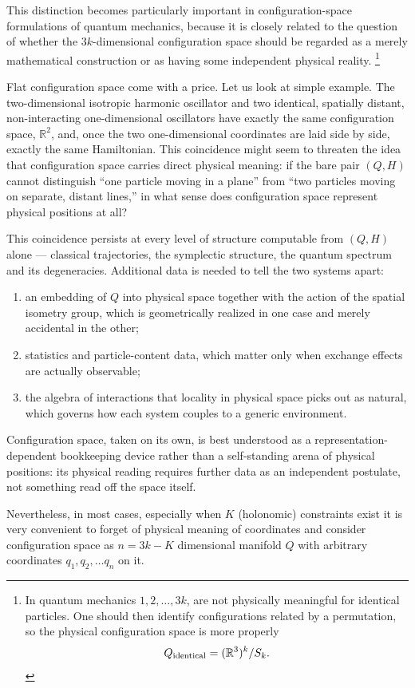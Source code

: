 This distinction becomes particularly important in configuration-space
formulations of  quantum mechanics, because it is closely related
to the question of whether the \(3k\)-dimensional configuration space should be
regarded as a merely mathematical construction or as having some independent
physical reality.
\footnote{In quantum mechanics  $ 1,2,\ldots,3k $,
are not physically meaningful for identical particles. One should then identify
configurations related by a permutation,
so the physical configuration space is more properly
\[ Q_{\rm identical} = (\mathbb R^3)^k/S_k. \]}

Flat configuration space  come with a price. Let us look at simple example.
The two-dimensional isotropic harmonic oscillator and two identical, spatially
distant, non-interacting one-dimensional oscillators have exactly the same
configuration space, $\mathbb{R}^2$, and, once the two one-dimensional
coordinates are laid side by side, exactly the same Hamiltonian. This
coincidence might seem to threaten the idea that configuration space carries
direct physical meaning: if the bare pair $(Q,H)$ cannot distinguish ``one
particle moving in a plane'' from ``two particles moving on separate, distant
lines,'' in what sense does configuration space represent physical positions at
all? 

This coincidence  persists at every
level of structure computable from $(Q,H)$ alone --- classical trajectories,
the symplectic structure, the quantum spectrum and its degeneracies.
Additional data is needed to tell the two systems
apart: 
\begin{enumerate}
   \item an embedding of $Q$ into physical space together with the action of
the spatial isometry group, which is geometrically realized in one case and
merely accidental in the other;
   \item statistics and particle-content data,
which matter only when exchange effects are actually observable;
   \item the
algebra of interactions that locality in physical space picks out as natural,
which governs how each system couples to a generic environment.
\end{enumerate}
Configuration space, taken on its own, is best understood as a
representation-dependent bookkeeping device rather than a self-standing arena
of physical positions: its physical reading requires further data as an
independent postulate, not something read off the space itself.

Nevertheless, in most cases, especially when $K$ (holonomic) constraints 
 exist it is very convenient to forget
of physical meaning of coordinates and consider configuration space as $ n=3 k -K $
dimensional manifold  $ Q $ with arbitrary coordinates $q_1,q_2,\ldots q_n$ on it.

